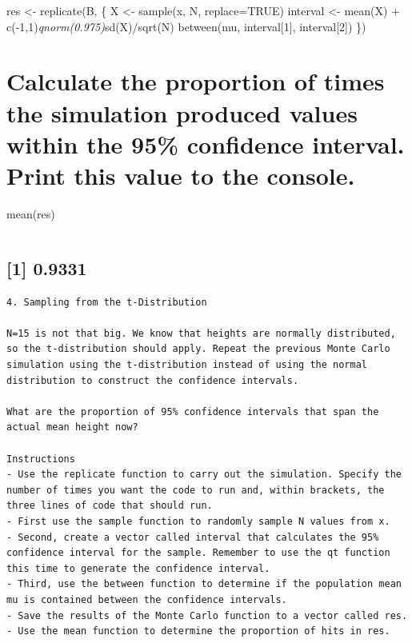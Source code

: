 \documentclass[
]{article}
\begin{document}
res \textless- replicate(B, \{ X \textless- sample(x, N, replace=TRUE)
interval \textless- mean(X) + c(-1,1)\emph{qnorm(0.975)}sd(X)/sqrt(N)
between(mu, interval{[}1{]}, interval{[}2{]}) \})

\hypertarget{calculate-the-proportion-of-times-the-simulation-produced-values-within-the-95-confidence-interval.-print-this-value-to-the-console.}{%
\section{Calculate the proportion of times the simulation produced
values within the 95\% confidence interval. Print this value to the
console.}\label{calculate-the-proportion-of-times-the-simulation-produced-values-within-the-95-confidence-interval.-print-this-value-to-the-console.}}

mean(res)

\begin{verbatim}
\end{verbatim}

\hypertarget{section-2}{%
\subsection{{[}1{]} 0.9331}\label{section-2}}

\begin{verbatim}
4. Sampling from the t-Distribution

N=15 is not that big. We know that heights are normally distributed, so the t-distribution should apply. Repeat the previous Monte Carlo simulation using the t-distribution instead of using the normal distribution to construct the confidence intervals.

What are the proportion of 95% confidence intervals that span the actual mean height now?

Instructions
- Use the replicate function to carry out the simulation. Specify the number of times you want the code to run and, within brackets, the three lines of code that should run.
- First use the sample function to randomly sample N values from x.
- Second, create a vector called interval that calculates the 95% confidence interval for the sample. Remember to use the qt function this time to generate the confidence interval.
- Third, use the between function to determine if the population mean mu is contained between the confidence intervals.
- Save the results of the Monte Carlo function to a vector called res.
- Use the mean function to determine the proportion of hits in res.
\end{verbatim}
\end{document}
